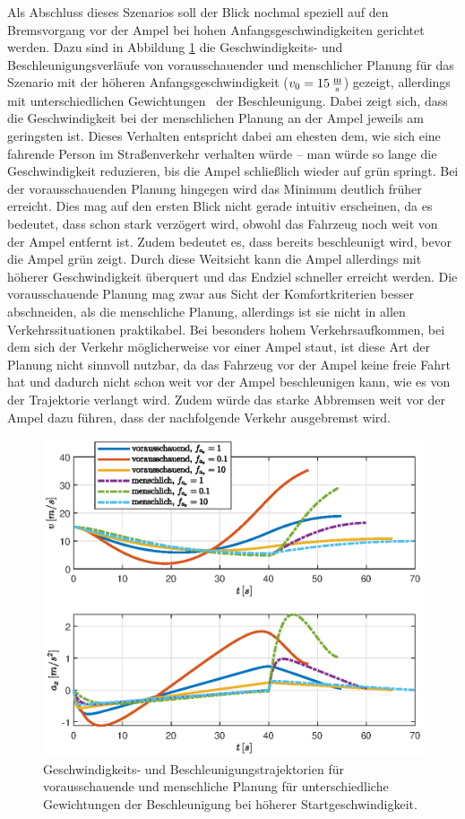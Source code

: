 Als Abschluss dieses Szenarios soll der Blick nochmal speziell auf den Bremsvorgang vor der Ampel bei hohen Anfangsgeschwindigkeiten gerichtet werden. Dazu sind in Abbildung \ref{fig:va_fa_variabel} die Geschwindigkeits- und Beschleunigungsverläufe von vorausschauender und menschlicher Planung für das Szenario mit der höheren Anfangsgeschwindigkeit ($v_0 = 15\,\mathrm{\frac{\mathrm{m}}{\mathrm{s}}}$) gezeigt, allerdings mit unterschiedlichen Gewichtungen \fax~der Beschleunigung. Dabei zeigt sich, dass die Geschwindigkeit bei der menschlichen Planung an der Ampel jeweils am geringsten ist. Dieses Verhalten entspricht dabei am ehesten dem, wie sich eine fahrende Person im Straßenverkehr verhalten würde -- man würde so lange die Geschwindigkeit reduzieren, bis die Ampel schließlich wieder auf grün springt. Bei der vorausschauenden Planung hingegen wird das Minimum deutlich früher erreicht. Dies mag auf den ersten Blick nicht gerade intuitiv erscheinen, da es bedeutet, dass schon stark verzögert wird, obwohl das Fahrzeug noch weit von der Ampel entfernt ist. Zudem bedeutet es, dass bereits beschleunigt wird, bevor die Ampel grün zeigt. Durch diese Weitsicht kann die Ampel allerdings mit höherer Geschwindigkeit überquert und das Endziel schneller erreicht werden. Die vorausschauende Planung mag zwar aus Sicht der Komfortkriterien besser abschneiden, als die menschliche Planung, allerdings ist sie nicht in allen Verkehrssituationen praktikabel. Bei besonders hohem Verkehrsaufkommen, bei dem sich der Verkehr möglicherweise vor einer Ampel staut, ist diese Art der Planung nicht sinnvoll nutzbar, da das Fahrzeug vor der Ampel keine freie Fahrt hat und dadurch nicht schon weit vor der Ampel beschleunigen kann, wie es von der Trajektorie verlangt wird. Zudem würde das starke Abbremsen weit vor der Ampel dazu führen, dass der nachfolgende Verkehr ausgebremst wird.
\begin{figure}[h] 
	\centering
	\includegraphics[width=0.9\linewidth]{./Bilder/Ergebnisse/Geradeausfahrt/Ampel/v_5_v_15/va_fa_variabel.eps}
	\caption{Geschwindigkeits- und Beschleunigungstrajektorien für vorausschauende und menschliche Planung für unterschiedliche Gewichtungen der Beschleunigung bei höherer Startgeschwindigkeit.}
	\label{fig:va_fa_variabel}
\end{figure}  

